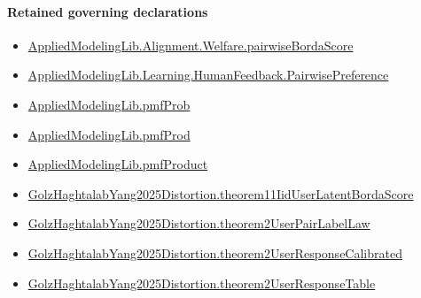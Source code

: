 \documentclass[10pt]{article}
\begin{document}
\paragraph{Retained governing declarations}
\begin{itemize}\raggedright
\item \hyperlink{governing-declaration-3808cf59ea39b435}{Applied\allowbreak{}Modeling\allowbreak{}Lib.\allowbreak{}Alignment.\allowbreak{}Welfare.\allowbreak{}pairwise\allowbreak{}Borda\allowbreak{}Score}
\item \hyperlink{library-prerequisite-7e2db20cf087d9ba}{Applied\allowbreak{}Modeling\allowbreak{}Lib.\allowbreak{}Learning.\allowbreak{}Human\allowbreak{}Feedback.\allowbreak{}Pairwise\allowbreak{}Preference}
\item \hyperlink{governing-declaration-9c38d53b9d664221}{Applied\allowbreak{}Modeling\allowbreak{}Lib.\allowbreak{}pmf\allowbreak{}Prob}
\item \hyperlink{library-prerequisite-de8e2a8bfe221a38}{Applied\allowbreak{}Modeling\allowbreak{}Lib.\allowbreak{}pmf\allowbreak{}Prod}
\item \hyperlink{governing-declaration-5ac12d0a52b69068}{Applied\allowbreak{}Modeling\allowbreak{}Lib.\allowbreak{}pmf\allowbreak{}Product}
\item \hyperlink{governing-declaration-7506044331f97cc9}{Golz\allowbreak{}Haghtalab\allowbreak{}Yang2025\allowbreak{}Distortion.\allowbreak{}theorem11\allowbreak{}Iid\allowbreak{}User\allowbreak{}Latent\allowbreak{}Borda\allowbreak{}Score}
\item \hyperlink{governing-declaration-98c3ee9a11a59ef9}{Golz\allowbreak{}Haghtalab\allowbreak{}Yang2025\allowbreak{}Distortion.\allowbreak{}theorem2\allowbreak{}User\allowbreak{}Pair\allowbreak{}Label\allowbreak{}Law}
\item \hyperlink{governing-declaration-080b9388e51a6018}{Golz\allowbreak{}Haghtalab\allowbreak{}Yang2025\allowbreak{}Distortion.\allowbreak{}theorem2\allowbreak{}User\allowbreak{}Response\allowbreak{}Calibrated}
\item \hyperlink{governing-declaration-c5d0273cbd7ddcc9}{Golz\allowbreak{}Haghtalab\allowbreak{}Yang2025\allowbreak{}Distortion.\allowbreak{}theorem2\allowbreak{}User\allowbreak{}Response\allowbreak{}Table}
\end{itemize}
\end{document}
